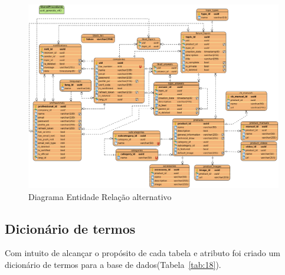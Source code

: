 \begin{figure}[htb]
    \centering
    
    \includegraphics[width=\textwidth]{images/diagramas/diagrama_bd_alt.png}
    \caption{Diagrama Entidade Relação alternativo}
    \label{fig:21}
\end{figure}

\newpage

\subsection{Dicionário de termos}

Com intuito de alcançar o propósito de cada tabela e atributo 
foi criado um dicionário de termos para a base de dados(Tabela~\ref{tab:18}).

